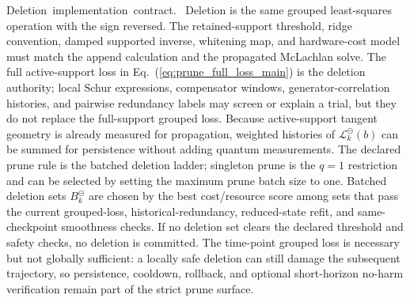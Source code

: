 \documentclass[
  reprint,
  amsmath,
  amssymb,
  aps,
  pra,
  nofootinbib,
  superscriptaddress,
  floatfix
]{revtex4-2}
\newcommand{\tentative}[1]{\textcolor{red!70!black}{#1}}
\newcommand{\structlabel}[1]{\noindent\mbox{\tentative{#1.}}~}
\begin{document}
\structlabel{Deletion implementation contract}
Deletion is the same grouped least-squares operation with the sign reversed.  The retained-support threshold, ridge convention, damped supported inverse, whitening map, and hardware-cost model must match the append calculation and the propagated McLachlan solve.  The full active-support loss in Eq.~(\ref{eq:prune_full_loss_main}) is the deletion authority; local Schur expressions, compensator windows, generator-correlation histories, and pairwise redundancy labels may screen or explain a trial, but they do not replace the full-support grouped loss.  Because active-support tangent geometry is already measured for propagation, weighted histories of \(\mathcal L_k^{\ominus}(b)\) can be summed for persistence without adding quantum measurements.  The declared prune rule is the batched deletion ladder; singleton prune is the \(q=1\) restriction and can be selected by setting the maximum prune batch size to one.  Batched deletion sets \(B_k^{\ominus}\) are chosen by the best cost/resource score among sets that pass the current grouped-loss, historical-redundancy, reduced-state refit, and same-checkpoint smoothness checks.  If no deletion set clears the declared threshold and safety checks, no deletion is committed.  The time-point grouped loss is necessary but not globally sufficient: a locally safe deletion can still damage the subsequent trajectory, so persistence, cooldown, rollback, and optional short-horizon no-harm verification remain part of the strict prune surface.
\end{document}
